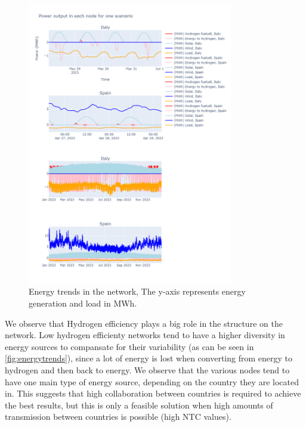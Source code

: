 \documentclass[english]{article}
\numberwithin{definition}{section}
\numberwithin{theorem}{section}
\numberwithin{problem}{section}
\begin{document}
\begin{figure}[H]
  \centering
  \includegraphics[width=0.80\textwidth]{immagini/ImmaginiOptimization/image1.png}
  \caption{Energy trends in the network, The y-axis represents energy generation and load in MWh.}
  \label{fig:higheffenergytrends}
\end{figure}
We observe that Hydrogen efficiency plays a big role in the structure on the network. Low hydrogen efficienty networks tend to have a higher diversity in energy sources to compansate for their variability (as can be seen in \ref{fig:energytrends}), since a lot of energy is lost when converting from energy to hydrogen and then back to energy. We observe that the various nodes tend to have one main type of energy source, depending on the country they are located in. This suggests that high collaboration between countries is required to achieve the best results, but this is only a feasible solution when high amounts of transmission between countries is possible (high NTC values).
\end{document}

